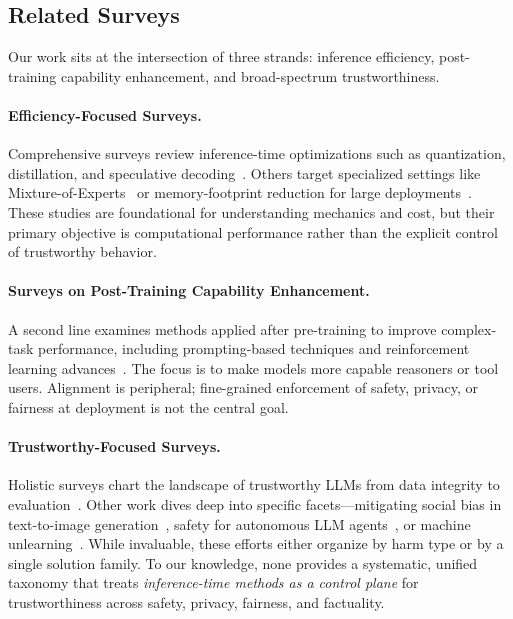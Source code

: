 \subsection{Related Surveys}
Our work sits at the intersection of three strands: inference efficiency, post-training capability enhancement, and broad-spectrum trustworthiness.

\paragraph{Efficiency-Focused Surveys.}
Comprehensive surveys review inference-time optimizations such as quantization, distillation, and speculative decoding~\citep{survey:inference_efficiency1}. Others target specialized settings like Mixture-of-Experts~\citep{survey:inference_moe} or memory-footprint reduction for large deployments~\citep{survey:inference_efficiency2}. These studies are foundational for understanding mechanics and cost, but their primary objective is computational performance rather than the explicit control of trustworthy behavior.

\paragraph{Surveys on Post-Training Capability Enhancement.}
A second line examines methods applied after pre-training to improve complex-task performance, including prompting-based techniques and reinforcement learning advances~\citep{survey:post-training1, survey:post-training2}. The focus is to make models more capable reasoners or tool users. Alignment is peripheral; fine-grained enforcement of safety, privacy, or fairness at deployment is not the central goal.

\paragraph{Trustworthy-Focused Surveys.}
Holistic surveys chart the landscape of trustworthy LLMs from data integrity to evaluation~\citep{survey:trustworthy1, survey:trustworthy2}. Other work dives deep into specific facets---mitigating social bias in text-to-image generation~\citep{survey:trustworthy_text2img}, safety for autonomous LLM agents~\citep{survey:trustworthy_agents}, or machine unlearning~\citep{survey:unlearning1, survey:unlearning2}. While invaluable, these efforts either organize by harm type or by a single solution family. To our knowledge, none provides a systematic, unified taxonomy that treats \emph{inference-time methods as a control plane} for trustworthiness across safety, privacy, fairness, and factuality.

